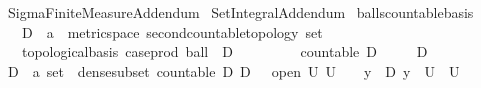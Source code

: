 %
\begin{isabellebody}%
%
%
\isadelimtheory
%
\endisadelimtheory
%
\isatagtheory
{}\isamarkupfalse%
\ Sigma{\isacharunderscore}{\kern0pt}Finite{\isacharunderscore}{\kern0pt}Measure{\isacharunderscore}{\kern0pt}Addendum\isanewline
{}\ Set{\isacharunderscore}{\kern0pt}Integral{\isacharunderscore}{\kern0pt}Addendum\isanewline
{}%
\endisatagtheory
{\isafoldtheory}%
%
\isadelimtheory
\isanewline
%
\endisadelimtheory
\isanewline
\isanewline
{}\isamarkupfalse%
\ balls{\isacharunderscore}{\kern0pt}countable{\isacharunderscore}{\kern0pt}basis{\isacharcolon}{\kern0pt}\isanewline
\ \ \ D\ {\isacharcolon}{\kern0pt}{\isacharcolon}{\kern0pt}\ {\isachardoublequoteopen}{\isacharprime}{\kern0pt}a\ {\isacharcolon}{\kern0pt}{\isacharcolon}{\kern0pt}\ {\isacharbraceleft}{\kern0pt}metric{\isacharunderscore}{\kern0pt}space{\isacharcomma}{\kern0pt}\ second{\isacharunderscore}{\kern0pt}countable{\isacharunderscore}{\kern0pt}topology{\isacharbraceright}{\kern0pt}\ set{\isachardoublequoteclose}\ \isanewline
\ \ \ {\isachardoublequoteopen}topological{\isacharunderscore}{\kern0pt}basis\ {\isacharparenleft}{\kern0pt}case{\isacharunderscore}{\kern0pt}prod\ ball\ {\isacharbackquote}{\kern0pt}\ {\isacharparenleft}{\kern0pt}D\ {\isasymtimes}\ {\isacharparenleft}{\kern0pt}{\isasymrat}\ {\isasyminter}\ {\isacharbraceleft}{\kern0pt}{}{\isacharless}{\kern0pt}{\isachardot}{\kern0pt}{\isachardot}{\kern0pt}{\isacharbraceright}{\kern0pt}{\isacharparenright}{\kern0pt}{\isacharparenright}{\kern0pt}{\isacharparenright}{\kern0pt}{\isachardoublequoteclose}\isanewline
\ \ \ \ \ {\isachardoublequoteopen}countable\ D{\isachardoublequoteclose}\isanewline
\ \ \ \ \ {\isachardoublequoteopen}D\ {\isasymnoteq}\ {\isacharbraceleft}{\kern0pt}{\isacharbraceright}{\kern0pt}{\isachardoublequoteclose}\ \ \ \ \isanewline
%
\isadelimproof
%
\endisadelimproof
%
\isatagproof
{}\isamarkupfalse%
\ {\isacharminus}{\kern0pt}\isanewline
\ \ \isamarkupfalse%
\ D\ {\isacharcolon}{\kern0pt}{\isacharcolon}{\kern0pt}\ {\isachardoublequoteopen}{\isacharprime}{\kern0pt}a\ set{\isachardoublequoteclose}\ \ dense{\isacharunderscore}{\kern0pt}subset{\isacharcolon}{\kern0pt}\ {\isachardoublequoteopen}countable\ D{\isachardoublequoteclose}\ {\isachardoublequoteopen}D\ {\isasymnoteq}\ {\isacharbraceleft}{\kern0pt}{\isacharbraceright}{\kern0pt}{\isachardoublequoteclose}\ {\isachardoublequoteopen}{\isasymlbrakk}open\ U{\isacharsemicolon}{\kern0pt}\ U\ {\isasymnoteq}\ {\isacharbraceleft}{\kern0pt}{\isacharbraceright}{\kern0pt}{\isasymrbrakk}\ {\isasymLongrightarrow}\ {\isasymexists}y\ {\isasymin}\ D{\isachardot}{\kern0pt}\ y\ {\isasymin}\ U{\isachardoublequoteclose}\ \ U\ \isamarkupfalse%

\end{isabellebody}
